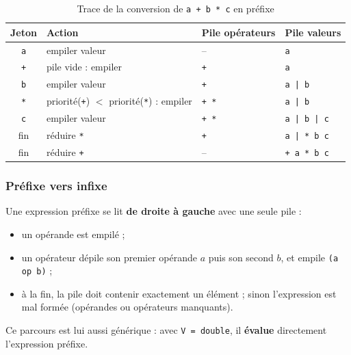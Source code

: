 \documentclass[11pt,a4paper]{article}
\newcommand{\code}[1]{\texttt{#1}}
\begin{document}
\begin{table}[H]
\centering
\small
\begin{tabular}{clll}
  \toprule
  \textbf{Jeton} & \textbf{Action} & \textbf{Pile opérateurs} & \textbf{Pile valeurs} \\
  \midrule
  \code{a} & empiler valeur                          & --              & \code{a} \\
  \code{+} & pile vide : empiler                     & \code{+}        & \code{a} \\
  \code{b} & empiler valeur                          & \code{+}        & \code{a | b} \\
  \code{*} & priorité(\code{+}) $<$ priorité(\code{*}) : empiler & \code{+ *} & \code{a | b} \\
  \code{c} & empiler valeur                          & \code{+ *}      & \code{a | b | c} \\
  fin      & réduire \code{*}                        & \code{+}        & \code{a | * b c} \\
  fin      & réduire \code{+}                        & --              & \code{+ a * b c} \\
  \bottomrule
\end{tabular}
\caption{Trace de la conversion de \code{a + b * c} en préfixe}
\end{table}

\subsubsection{Préfixe vers infixe}

Une expression préfixe se lit \textbf{de droite à gauche} avec une seule
pile :
\begin{itemize}
  \item un opérande est empilé ;
  \item un opérateur dépile son premier opérande $a$ puis son second $b$,
        et empile \og \code{(a op b)} \fg{} ;
  \item à la fin, la pile doit contenir exactement un élément ; sinon
        l'expression est mal formée (opérandes ou opérateurs manquants).
\end{itemize}
Ce parcours est lui aussi générique : avec \code{V = double}, il
\textbf{évalue} directement l'expression préfixe.
\end{document}
